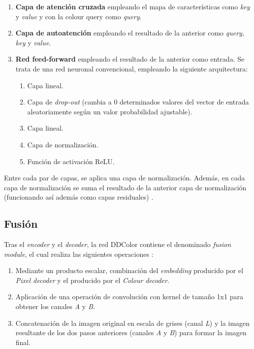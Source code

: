 \documentclass[a4paper]{article}
\begin{document}
\begin{enumerate}
  \item{\textbf{Capa de atención cruzada} empleando el mapa de características como \textit{key} y \textit{value} y con la colour query como \textit{query}.}
  \item{\textbf{Capa de autoatención} empleando el resultado de la anterior como \textit{query}, \textit{key} y \textit{value}.}
  \item{\textbf{Red feed-forward} empleando el resultado de la anterior como entrada. Se trata de una red neuronal convencional, empleando la siguiente arquitectura:
    \begin{enumerate}
      \item{Capa lineal.}
      \item{Capa de \textit{drop-out} (cambia a 0 determinados valores del vector de entrada aleatoriamente según un valor probabilidad ajustable).}
      \item{Capa lineal.}
      \item{Capa de normalización.}
      \item{Función de activación ReLU.}
    \end{enumerate}
  }
\end{enumerate}

Entre cada par de capas, se aplica una capa de normalización. Además, en cada capa de normalización se suma el resultado de la anterior capa de normalización (funcionando así además como capas residuales) \cite{DDColor}.

\subsection{Fusión}

Tras el \textit{encoder} y el \textit{decoder}, la red DDColor contiene el denominado \textit{fusion module}, el cual realiza las siguientes operaciones \cite{DDColor}:

\begin{enumerate}
  \item{Mediante un producto escalar, combinación del \textit{embedding} producido por el \textit{Pixel decoder} y el producido por el \textit{Colour decoder}.}
  \item{Aplicación de una operación de convolución con kernel de tamaño 1x1 para obtener los canales \textit{A} y \textit{B}.}
  \item{Concatenación de la imagen original en escala de grises (canal \textit{L}) y la imagen resultante de los dos pasos anteriores (canales \textit{A} y \textit{B}) para formar la imagen final.}
\end{enumerate}
\end{document}
